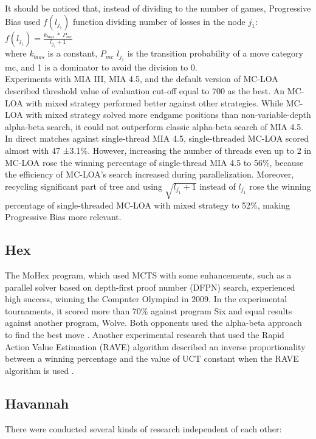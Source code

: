 \documentclass[paper=8.27in:11.69in]{scrartcl}
\begin{document}
It should be noticed that, instead of dividing to the number of games, Progressive Bias used $f({l_{j_{1}}})$ function dividing number of losses in the node ${j_{1}}$:\\

$f({l_{j_{1}}}) = \frac{k_{bias}  \ * \ P_{mc}}{l_{j_{1}}+ 1}$\\

where $k_{bias}$ is a constant, $P_{mc}$ $l_{j_{1}}$ is the transition probability of a move category mc, and 1 is a dominator to avoid the division to 0.\\

Experiments with MIA III, MIA 4.5, and the default version of MC-LOA described threshold value of evaluation cut-off equal to 700 as the best. An MC-LOA with mixed strategy performed better against other strategies. While MC-LOA with mixed strategy solved more endgame positions than non-variable-depth alpha-beta search, it could not outperform classic alpha-beta search of MIA 4.5. In direct matches against single-thread MIA 4.5, single-threaded MC-LOA scored almost with 47 ±3.1\%. However, increasing the number of threads even up to 2 in MC-LOA rose the winning percentage of single-thread MIA 4.5 to 56\%, because the efficiency of MC-LOA’s search increased during parallelization. Moreover, recycling significant part of tree and using $\sqrt{{l_{j_{1}}+ 1}}$ instead of ${l_{j_{1}}}$ rose the winning percentage of single-threaded MC-LOA with mixed strategy to 52\%, making Progressive Bias more relevant\cite{Winands2010MonteCT}.
\subsection{Hex}
The MoHex program, which used MCTS with some enhancements, such as a parallel solver based on depth-first proof number (DFPN) search, experienced high success, winning the Computer Olympiad in 2009. In the experimental tournaments, it scored more than 70\% against program Six and equal results against another program, Wolve. Both opponents used the alpha-beta approach to find the best move \cite{Arneson2010MonteCT}. Another experimental research that used the Rapid Action Value Estimation (RAVE) algorithm described an inverse proportionality between a winning percentage and the value of UCT constant when the RAVE algorithm is used \cite{Cazenave2010MonteCarloH}.
\subsection{Havannah}
There were conducted several kinds of research independent of each other:\\
\end{document}
